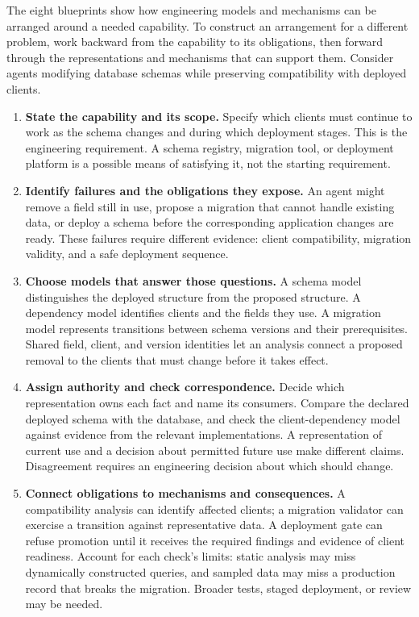 
The eight blueprints show how engineering models and mechanisms can be arranged around a needed capability. To construct an arrangement for a different problem, work backward from the capability to its obligations, then forward through the representations and mechanisms that can support them. Consider agents modifying database schemas while preserving compatibility with deployed clients.

\begin{enumerate}
\item \textbf{State the capability and its scope.} Specify which clients must continue to work as the schema changes and during which deployment stages. This is the engineering requirement. A schema registry, migration tool, or deployment platform is a possible means of satisfying it, not the starting requirement.

\item \textbf{Identify failures and the obligations they expose.} An agent might remove a field still in use, propose a migration that cannot handle existing data, or deploy a schema before the corresponding application changes are ready. These failures require different evidence: client compatibility, migration validity, and a safe deployment sequence.

\item \textbf{Choose models that answer those questions.} A schema model distinguishes the deployed structure from the proposed structure. A dependency model identifies clients and the fields they use. A migration model represents transitions between schema versions and their prerequisites. Shared field, client, and version identities let an analysis connect a proposed removal to the clients that must change before it takes effect.

\item \textbf{Assign authority and check correspondence.} Decide which representation owns each fact and name its consumers. Compare the declared deployed schema with the database, and check the client-dependency model against evidence from the relevant implementations. A representation of current use and a decision about permitted future use make different claims. Disagreement requires an engineering decision about which should change.

\item \textbf{Connect obligations to mechanisms and consequences.} A compatibility analysis can identify affected clients; a migration validator can exercise a transition against representative data. A deployment gate can refuse promotion until it receives the required findings and evidence of client readiness. Account for each check's limits: static analysis may miss dynamically constructed queries, and sampled data may miss a production record that breaks the migration. Broader tests, staged deployment, or review may be needed.


\end{enumerate}
